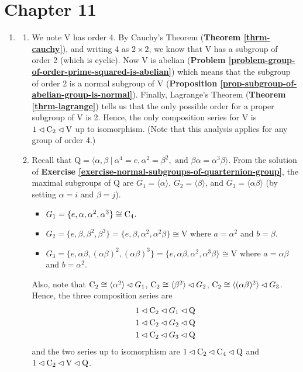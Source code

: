 \section*{Chapter 11}
\begin{enumerate}
    \item \begin{enumerate}[label=(\roman*)]
        \item We note $\mathrm{V}$ has order 4. By Cauchy's Theorem (\textbf{Theorem \ref{thrm-cauchy}}), and writing 4 as $2 \times 2$, we know that $\mathrm{V}$ has a subgroup of order 2 (which is cyclic). Now $\mathrm{V}$ is abelian (\textbf{Problem \ref{problem-group-of-order-prime-squared-is-abelian}}) which means that the subgroup of order 2 is a normal subgroup of $\mathrm{V}$ (\textbf{Proposition \ref{prop-subgroup-of-abelian-group-is-normal}}). Finally, Lagrange's Theorem (\textbf{Theorem \ref{thrm-lagrange}}) tells us that the only possible order for a proper subgroup of $\mathrm{V}$ is 2. Hence, the only composition series for $\mathrm{V}$ is $1 \lhd \mathrm{C}_{2} \lhd \mathrm{V}$ up to isomorphism.\newline
        (Note that this analysis applies for any group of order 4.)
        
        \item Recall that $\mathrm{Q} = \langle \alpha, \beta \ | \ \alpha^4 = e, \alpha^2 = \beta^2, \text{ and } \beta\alpha = \alpha^3\beta \rangle$. From the solution of \textbf{Exercise \ref{exercise-normal-subgroups-of-quarternion-group}}, the maximal subgroups of $\mathrm{Q}$ are $G_1 = \langle \alpha \rangle$, $G_2 = \langle \beta \rangle$, and $G_3 = \langle \alpha\beta \rangle$ (by setting $\alpha = i$ and $\beta = j$).
        \begin{itemize}
            \item $G_1 = \{e, \alpha, \alpha^2, \alpha^3\} \cong \mathrm{C}_{4}$.
            \item $G_2 = \{e, \beta, \beta^2, \beta^3\} = \{e, \beta, \alpha^2, \alpha^2\beta\} \cong \mathrm{V}$ where $a = \alpha^2$ and $b = \beta$.
            \item $G_3 = \{e, \alpha\beta, (\alpha\beta)^2, (\alpha\beta)^3\} = \{e, \alpha\beta, \alpha^2, \alpha^3\beta\} \cong \mathrm{V}$ where $a = \alpha\beta$ and $b = \alpha^2$.
        \end{itemize}
        Also, note that $\mathrm{C}_{2} \cong \langle \alpha^2 \rangle \lhd G_1$, $\mathrm{C}_{2} \cong \langle \beta^2 \rangle \lhd G_2$, $\mathrm{C}_{2} \cong \langle (\alpha\beta)^2 \rangle \lhd G_3$. Hence, the three composition series are
        \begin{align*}
            &1 \lhd \mathrm{C}_{2} \lhd G_1 \lhd \mathrm{Q}\\
            &1 \lhd \mathrm{C}_{2} \lhd G_2 \lhd \mathrm{Q}\\
            &1 \lhd \mathrm{C}_{2} \lhd G_3 \lhd \mathrm{Q}
        \end{align*}
        and the two series up to isomorphism are $1 \lhd \mathrm{C}_{2} \lhd \mathrm{C}_{4} \lhd \mathrm{Q}$ and $1 \lhd \mathrm{C}_{2} \lhd \mathrm{V} \lhd \mathrm{Q}$.
        

\end{enumerate}
\end{enumerate}
